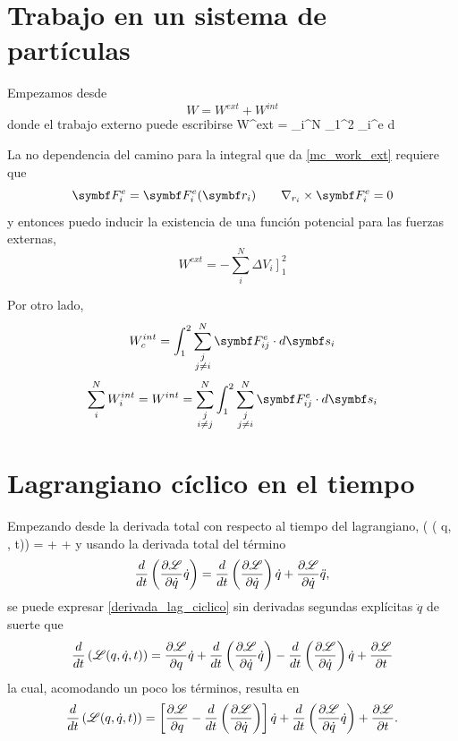 \documentclass[10pt,oneside]{CBFT_book}
\begin{document}
\section{Trabajo en un sistema de partículas}

Empezamos desde
\[
	W = W^{ext} + W^{int}
\]
donde el trabajo externo puede escribirse
\be
	W^{ext} = \sum_i^N \int_1^2 _i^e \cdot d
\label{mc_work_ext}
\ee

La no dependencia del camino para la integral que da \eqref{mc_work_ext} requiere que 
\[
	\vb{F}_i^e = \vb{F}_i^e( \vb{r}_i ) \qquad \nabla_{r_i} \times \vb{F}_i^e = 0
\]
y entonces puedo inducir la existencia de una función potencial para las fuerzas externas,
\[
	W^{ext} = - \sum_i^N  \left. \Delta V_i \right]_1^2 
\]

Por otro lado,
\[
	W^{int}_c = \int_1^2 \sum_{\substack{j\\j\neq i}}^N  \vb{F}_{ij}^e \cdot d\vb{s}_i  
\]
\[
	\sum_i^N W_i^{int} =  W^{int} = \sum_{\substack{j \\ i\neq j}}^N  
	\int_1^2 \sum_{\substack{j \\ j\neq i}}^N  \vb{F}_{ij}^e \cdot d\vb{s}_i  
\]

\section{Lagrangiano cíclico en el tiempo}

Empezando desde la derivada total con respecto al tiempo del lagrangiano,
\be
	\left( \Lag( q, , t)\right) =
	  +   + 
	\label{derivada_lag_ciclico}
\ee
y usando la derivada total del término 
\[
	\frac{d}{dt}\left( \frac{\partial^{\hspace{-0.05em}} {\mathscr{L}}}{\partial {\dot{q}}^{\hspace{-0.05em}}}\dot{q}\right) =
	\frac{d}{dt}\left( \frac{\partial^{\hspace{-0.05em}} {\mathscr{L}}}{\partial {\dot{q}}^{\hspace{-0.05em}}} \right) \dot{q} + \frac{\partial^{\hspace{-0.05em}} {\mathscr{L}}}{\partial {\dot{q}}^{\hspace{-0.05em}}} \ddot{q},
\]
se puede expresar \eqref{derivada_lag_ciclico} sin derivadas segundas explícitas $\ddot{q}$ de suerte que 
\[
	\frac{d}{dt}\left( \mathscr{L}( q, \dot{q}, t)\right) = \frac{\partial^{\hspace{-0.05em}} {\mathscr{L}}}{\partial {q}^{\hspace{-0.05em}}} \dot{q} + \frac{d}{dt}\left( 
	\frac{\partial^{\hspace{-0.05em}} {\mathscr{L}}}{\partial {\dot{q}}^{\hspace{-0.05em}}}\dot{q}\right) - \frac{d}{dt}\left( \frac{\partial^{\hspace{-0.05em}} {\mathscr{L}}}{\partial {\dot{q}}^{\hspace{-0.05em}}} \right) \dot{q} + \frac{\partial^{\hspace{-0.05em}} {\mathscr{L}}}{\partial {t}^{\hspace{-0.05em}}}
\]
la cual, acomodando un poco los términos, resulta en
\[
	\frac{d}{dt}\left( \mathscr{L}( q, \dot{q}, t)\right) = 
	\left[ \frac{\partial^{\hspace{-0.05em}} {\mathscr{L}}}{\partial {q}^{\hspace{-0.05em}}}  - \frac{d}{dt}\left( \frac{\partial^{\hspace{-0.05em}} {\mathscr{L}}}{\partial {\dot{q}}^{\hspace{-0.05em}}} \right) \right] \dot{q} + 
	\frac{d}{dt}\left( \frac{\partial^{\hspace{-0.05em}} {\mathscr{L}}}{\partial {\dot{q}}^{\hspace{-0.05em}}}\dot{q}\right)  + \frac{\partial^{\hspace{-0.05em}} {\mathscr{L}}}{\partial {t}^{\hspace{-0.05em}}}.
\]
\end{document}
